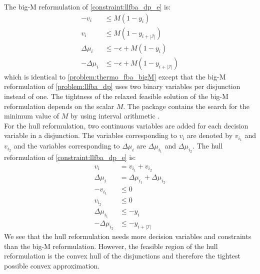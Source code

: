 The big-M reformulation of \cref{constraint:llfba_dp_e} is:
\begin{align*}
    -v_i &\leq M (1 - y_i) \\
    v_i &\leq M (1- y_{i + |\mathcal{I}|}) \\
    \Delta \mu_i &\leq -\epsilon + M (1 - y_i) \\ 
    - \Delta \mu_i &\leq -\epsilon + M(1 - y_{i + |\mathcal{I}|})
\end{align*}
which is identical to \cref{problem:thermo_fba_bigM} except that the big-M reformulation of \cref{problem:llfba_dp} uses two binary variables per disjunction instead of one.
The tightness of the relaxed feasible solution of the big-M reformulation depends on the scalar $M$. The package contains the search for the minimum value of $M$ by using interval arithmetic \cite{hutchison_automating_2010}.\\
For the hull reformulation, two continuous variables are added for each decision variable in a disjunction. The variables corresponding to $v_i$ are denoted by $v_{i_1}$ and $v_{i_2}$ and the variables corresponding to $\Delta \mu_i$ are $\Delta \mu_{i_1}$ and $\Delta \mu_{i_2}$. The hull reformulation of \cref{constraint:llfba_dp_e} is:
\begin{align*}
    v_i &= v_{i_1} + v_{i_2} \\
    \Delta \mu_i &= \Delta \mu_{i_1} + \Delta \mu_{i_2} \\
    - v_{i_1} &\leq 0 \\
    v_{i_2} &\leq 0 \\
    \Delta \mu_{i_1} &\leq - y_i \\ 
    - \Delta \mu_{i_2} &\leq -y_{i + |\mathcal{I}|} 
\end{align*}
We see that the hull reformulation needs more decision variables and constraints than the big-M reformulation. However, the feasible region of the hull reformulation is the convex hull of the disjunctions and therefore the tightest possible convex approximation. 


